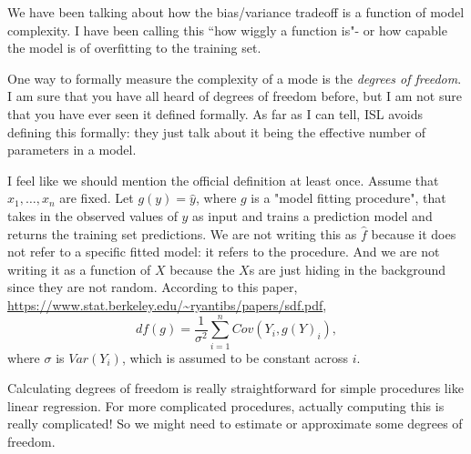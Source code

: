 We have been talking about how the bias/variance tradeoff is a function of model complexity. I have been calling this ``how wiggly a function is"- or how capable the model is of overfitting to the training set. 

One way to formally measure the complexity of a mode is the \emph{degrees of freedom}. I am sure that you have all heard of degrees of freedom before, but I am not sure that you have ever seen it defined formally. As far as I can tell, ISL avoids defining this formally: they just talk about it being the effective number of parameters in a model. 

I feel like we should mention the official definition at least once. Assume that $x_1,\ldots,x_n$ are fixed. Let $g(y) = \hat{y}$, where $g$ is a "model fitting procedure", that takes in the observed values of $y$ as input and trains a prediction model and returns the training set predictions. We are not writing this as $\hat{f}$ because it does not refer to a specific fitted model: it refers to the procedure. And we are not writing it as a function of $X$ because the $X$s are just hiding in the background since they are not random. According to this paper, \url{https://www.stat.berkeley.edu/~ryantibs/papers/sdf.pdf}, 
$$
df(g) = \frac{1}{\sigma^2} \sum_{i=1}^n Cov(Y_i, g(Y)_i),
$$
where $\sigma$ is $Var(Y_i)$, which is assumed to be constant across $i$. 

Calculating degrees of freedom is really straightforward for simple procedures like linear regression. For more complicated procedures, actually computing this is really complicated! So we might need to estimate or approximate some degrees of freedom. 

